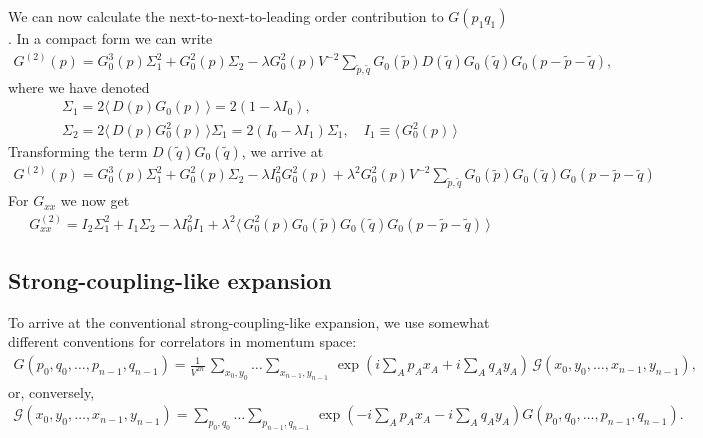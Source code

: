 \documentclass[12pt]{article}
\newcommand{\lr}[1]{ \left( #1 \right) }
\newcommand{\vev}[1]{ \langle \, #1 \, \rangle }
\newcommand{\expa}[1]{ \exp{\left( #1 \right)} }
\newcommand{\G}{\mathcal{G}}
\begin{document}
We can now calculate the next-to-next-to-leading order contribution to $G\lr{p_1 q_1}$. In a compact form we can write
\begin{eqnarray}
\label{Gp_nnlo1}
 G^{\lr{2}}\lr{p} = G_0^3\lr{p} \Sigma_1^2 + G_0^2\lr{p} \Sigma_2
 - \lambda G_0^2\lr{p} V^{-2}\sum\limits_{\tilde{p}, \tilde{q}} G_0\lr{\tilde{p}} D\lr{\tilde{q}} G_0\lr{\tilde{q}} G_0\lr{p - \tilde{p} - \tilde{q}} ,
\end{eqnarray}
where we have denoted
\begin{eqnarray}
\label{sigmas_def}
 \Sigma_1 = 2 \vev{D\lr{p} G_0\lr{p}} = 2 \lr{1 - \lambda I_0},
 \nonumber \\
 \Sigma_2 = 2 \vev{D\lr{p} G_0^2\lr{p}} \Sigma_1 = 2 \lr{I_0 - \lambda I_1} \Sigma_1 , \quad I_1 \equiv \vev{G_0^2\lr{p}}
\end{eqnarray}
Transforming the term $D\lr{\tilde{q}} G_0\lr{\tilde{q}}$, we arrive at
\begin{eqnarray}
\label{Gp_nnlo1}
 G^{\lr{2}}\lr{p} = G_0^3\lr{p} \Sigma_1^2 + G_0^2\lr{p} \Sigma_2
 - \lambda I_0^2 G_0^2\lr{p}
  +
  \lambda^2 G_0^2\lr{p} V^{-2}\sum\limits_{\tilde{p}, \tilde{q}} G_0\lr{\tilde{p}} G_0\lr{\tilde{q}} G_0\lr{p - \tilde{p} - \tilde{q}}
\end{eqnarray}
For $G_{xx}$ we now get
\begin{eqnarray}
\label{Gp_nnlo1}
 G_{xx}^{\lr{2}} = I_2 \Sigma_1^2 + I_1 \Sigma_2
 - \lambda I_0^2 I_1
  +
  \lambda^2 \vev{ G_0^2\lr{p} G_0\lr{\tilde{p}} G_0\lr{\tilde{q}} G_0\lr{p - \tilde{p} - \tilde{q}} }
\end{eqnarray}

\subsection*{Strong-coupling-like expansion}

 To arrive at the conventional strong-coupling-like expansion, we use somewhat different conventions for correlators in momentum space:
\begin{eqnarray}
\label{momentum_space_def}
 G\lr{p_0, q_0, \ldots, p_{n-1}, q_{n-1}} = \frac{1}{V^{2 n}} \,
\sum\limits_{x_0, y_0} \ldots \sum\limits_{x_{n-1}, y_{n-1}} \,
\expa{i \sum\limits_A p_A x_A + i \sum\limits_A q_A y_A} \,
\G\lr{x_0, y_0, \ldots, x_{n-1}, y_{n-1}}  ,
\end{eqnarray}
or, conversely,
\begin{eqnarray}
\label{momentum_space_def_inverse}
 \G\lr{x_0, y_0, \ldots, x_{n-1}, y_{n-1}}
 =
 \sum\limits_{p_0, q_0} \ldots \sum\limits_{p_{n-1}, q_{n-1}} \,
 \expa{-i \sum\limits_A p_A x_A - i \sum\limits_A q_A y_A}
  G\lr{p_0, q_0, \ldots, p_{n-1}, q_{n-1}} .
\end{eqnarray}
\end{document}
